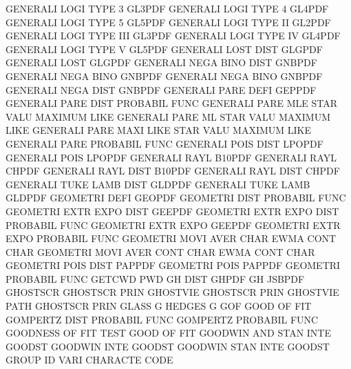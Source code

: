 GENERALI LOGI TYPE 3                    GL3PDF
GENERALI LOGI TYPE 4                    GL4PDF
GENERALI LOGI TYPE 5                    GL5PDF
GENERALI LOGI TYPE II                   GL2PDF
GENERALI LOGI TYPE III                  GL3PDF
GENERALI LOGI TYPE IV                   GL4PDF
GENERALI LOGI TYPE V                    GL5PDF
GENERALI LOST DIST                      GLGPDF
GENERALI LOST                           GLGPDF
GENERALI NEGA BINO DIST                 GNBPDF
GENERALI NEGA BINO                      GNBPDF
GENERALI NEGA BINO                      GNBPDF
GENERALI NEGA DIST                      GNBPDF
GENERALI PARE DEFI                      GEPPDF
GENERALI PARE DIST                      PROBABIL FUNC
GENERALI PARE MLE  STAR VALU            MAXIMUM  LIKE
GENERALI PARE ML   STAR VALU            MAXIMUM  LIKE
GENERALI PARE MAXI LIKE STAR VALU       MAXIMUM  LIKE
GENERALI PARE                           PROBABIL FUNC
GENERALI POIS DIST                      LPOPDF
GENERALI POIS                           LPOPDF
GENERALI RAYL                           B10PDF
GENERALI RAYL                           CHPDF
GENERALI RAYL DIST                      B10PDF
GENERALI RAYL DIST                      CHPDF
GENERALI TUKE LAMB DIST                 GLDPDF
GENERALI TUKE LAMB                      GLDPDF
GEOMETRI DEFI                           GEOPDF
GEOMETRI DIST                           PROBABIL FUNC
GEOMETRI EXTR EXPO DIST                 GEEPDF
GEOMETRI EXTR EXPO DIST                 PROBABIL FUNC
GEOMETRI EXTR EXPO                      GEEPDF
GEOMETRI EXTR EXPO                      PROBABIL FUNC
GEOMETRI MOVI AVER CHAR                 EWMA     CONT CHAR
GEOMETRI MOVI AVER CONT CHAR            EWMA     CONT CHAR
GEOMETRI POIS DIST                      PAPPDF
GEOMETRI POIS                           PAPPDF
GEOMETRI                                PROBABIL FUNC
GETCWD                                  PWD
GH       DIST                           GHPDF
GH                                      JSBPDF
GHOSTSCR                                GHOSTSCR PRIN
GHOSTVIE                                GHOSTSCR PRIN
GHOSTVIE PATH                           GHOSTSCR PRIN
GLASS    G                              HEDGES   G
GOF                                     GOOD     OF   FIT
GOMPERTZ DIST                           PROBABIL FUNC
GOMPERTZ                                PROBABIL FUNC
GOODNESS OF   FIT  TEST                 GOOD     OF   FIT
GOODWIN  AND  STAN INTE                 GOODST
GOODWIN  INTE                           GOODST
GOODWIN  STAN INTE                      GOODST
GROUP    ID   VARI                      CHARACTE CODE
